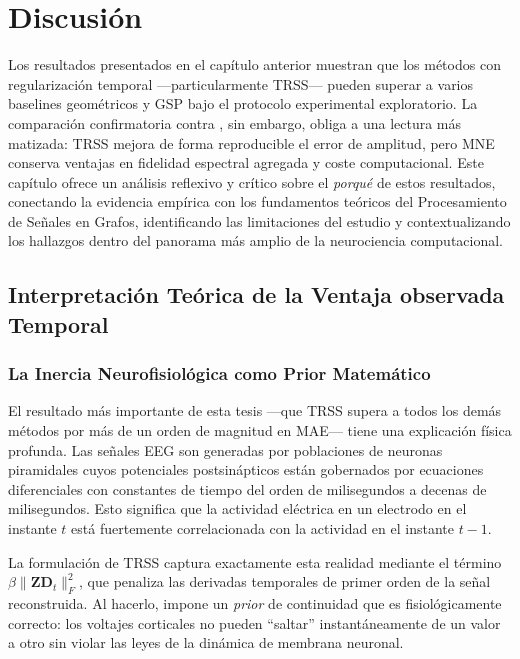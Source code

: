 \chapter{Discusión}

Los resultados presentados en el capítulo anterior muestran que los métodos con regularización temporal ---particularmente TRSS--- pueden superar a varios baselines geométricos y GSP bajo el protocolo experimental exploratorio. La comparación confirmatoria contra , sin embargo, obliga a una lectura más matizada: TRSS mejora de forma reproducible el error de amplitud, pero MNE conserva ventajas en fidelidad espectral agregada y coste computacional. Este capítulo ofrece un análisis reflexivo y crítico sobre el \textit{porqué} de estos resultados, conectando la evidencia empírica con los fundamentos teóricos del Procesamiento de Señales en Grafos, identificando las limitaciones del estudio y contextualizando los hallazgos dentro del panorama más amplio de la neurociencia computacional.

\section{Interpretación Teórica de la Ventaja observada Temporal}

\subsection{La Inercia Neurofisiológica como Prior Matemático}

El resultado más importante de esta tesis ---que TRSS supera a todos los demás métodos por más de un orden de magnitud en MAE--- tiene una explicación física profunda. Las señales EEG son generadas por poblaciones de neuronas piramidales cuyos potenciales postsinápticos están gobernados por ecuaciones diferenciales con constantes de tiempo del orden de milisegundos a decenas de milisegundos. Esto significa que la actividad eléctrica en un electrodo en el instante $t$ está fuertemente correlacionada con la actividad en el instante $t-1$.

La formulación de TRSS captura exactamente esta realidad mediante el término $\beta \|\mathbf{Z}\mathbf{D}_t\|_F^2$, que penaliza las derivadas temporales de primer orden de la señal reconstruida. Al hacerlo, impone un \textit{prior} de continuidad que es fisiológicamente correcto: los voltajes corticales no pueden ``saltar'' instantáneamente de un valor a otro sin violar las leyes de la dinámica de membrana neuronal.

